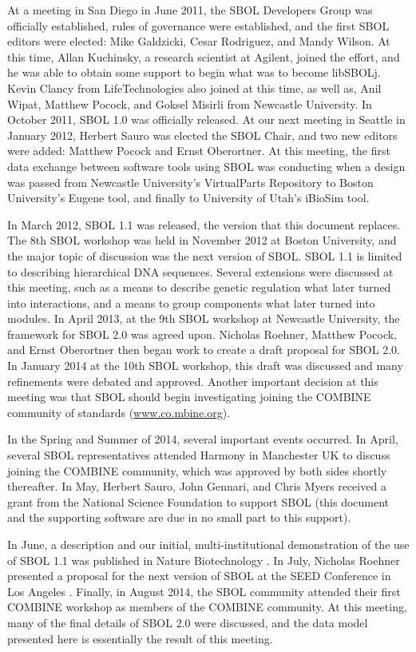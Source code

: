At a meeting in San Diego in June 2011, the SBOL Developers Group was officially established, rules of governance were established, and the first SBOL editors were elected: Mike Galdzicki, Cesar Rodriguez, and Mandy Wilson.  At this time, Allan Kuchinsky, a research scientist at Agilent, joined the effort, and he was able to obtain some support to begin what was to become libSBOLj.  Kevin Clancy from LifeTechnologies also joined at this time, as well as, Anil Wipat, Matthew Pocock, and Goksel Misirli from Newcastle University.  In October 2011, SBOL 1.0 was officially released.  At our next meeting in Seattle in January 2012, Herbert Sauro was elected the SBOL Chair, and two new editors were added: Matthew Pocock and Ernst Oberortner.  At this meeting, the first data exchange between software tools using SBOL was conducting when a design was passed from Newcastle University's VirtualParts Repository to Boston University's Eugene tool, and finally to University of Utah's iBioSim tool. 

In March 2012, SBOL 1.1 was released, the version that this document replaces. The 8th SBOL workshop was held in November 2012 at Boston University, and the major topic of discussion was the next version of SBOL.  SBOL 1.1 is limited to describing hierarchical DNA sequences.  Several extensions were discussed at this meeting, such as a means to describe genetic regulation what later turned into interactions, and a means to group components what later turned into modules.  In April 2013, at the 9th SBOL workshop at Newcastle University, the framework for SBOL 2.0 was agreed upon.  Nicholas Roehner, Matthew Pocock, and Ernst Oberortner then began work to create a draft proposal for SBOL 2.0.  In January 2014 at the 10th SBOL workshop, this draft was discussed and many refinements were debated and approved.  Another important decision at this meeting was that SBOL should begin investigating joining the COMBINE community of standards (\url{www.co.mbine.org}). 

In the Spring and Summer of 2014, several important events occurred.  In April, several SBOL representatives attended Harmony in Manchester UK to discuss joining the COMBINE community, which was approved by both sides shortly thereafter.  In May, Herbert Sauro, John Gennari, and Chris Myers received a grant from the National Science Foundation to support SBOL (this document and the supporting software are due in no small part to this support).  

In June, a description and our initial, multi-institutional demonstration of the use of SBOL 1.1 was published in Nature Biotechnology \cite{galdzicki2014synthetic}. In July, Nicholas Roehner presented a proposal for the next version of SBOL at the SEED Conference in Los Angeles \cite{roehner2014proposed}.  Finally, in August 2014, the SBOL community attended their first COMBINE workshop as members of the COMBINE community.  At this meeting, many of the final details of SBOL 2.0 were discussed, and the data model presented here is essentially the result of this meeting.

